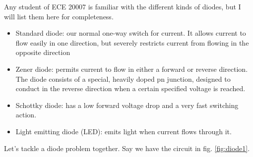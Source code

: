 \documentclass[nobib]{tufte-handout}
\begin{document}
Any student of ECE 20007 is familiar with the different kinds of diodes, but 
I will list them here for completeness. 
\begin{itemize}
    \item Standard diode: our normal one-way switch for current. 
    It allows current to flow easily in one direction, 
    but severely restricts current from flowing in the opposite direction
    \item Zener diode: permits current to flow in either a forward or 
    reverse direction. The diode consists of a special, heavily doped 
    pn junction, designed to conduct in the reverse direction when a 
    certain specified voltage is reached.
    \item Schottky diode: has a low forward voltage drop and a very fast switching action. 
    \item Light emitting diode (LED): emits light when current flows through it.
\end{itemize}

Let's tackle a diode problem together. Say we have the circuit in 
fig. \ref{fig:diode1}. 
\end{document}
